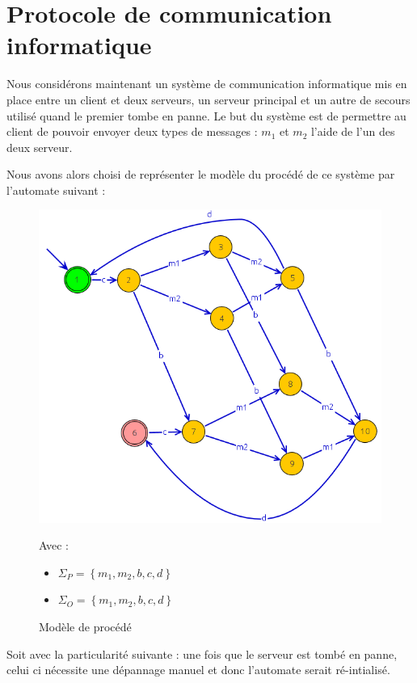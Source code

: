 \chapter{Protocole de communication informatique}
Nous considérons maintenant un système de communication informatique mis en place entre un client et deux serveurs, un serveur principal et un autre de secours utilisé quand le premier tombe en panne. Le but du système est de permettre au client de pouvoir envoyer deux types de messages : $m_1$ et $m_2$  l'aide de l'un des deux serveur.

Nous avons alors choisi de représenter le modèle du procédé de ce système par l'automate suivant :
\begin{figure}[!ht]
\begin{minipage}{0.5\textwidth}
\centering
\includegraphics[width = \textwidth]{./III/images/P.png}
\caption{Modèle de procédé}
\end{minipage}
\begin{minipage}{0.5\textwidth}
Avec : \begin{itemize}[label = \textbullet]
\item $\Sigma_P = \left\lbrace m_1, m_2, b, c, d \right\rbrace$
\item $\Sigma_O =  \left\lbrace m_1, m_2, b, c, d \right\rbrace$
\end{itemize}
\end{minipage}
\end{figure}
Soit avec la particularité suivante : une fois que le serveur est tombé en panne, celui ci nécessite une dépannage manuel et donc l'automate serait ré-intialisé. 

